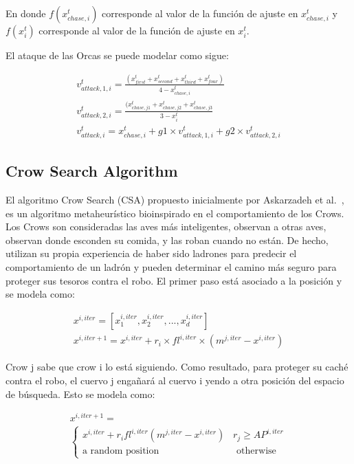 \documentclass[conference]{IEEEtran}
\begin{document}
\noindent En donde $f(x_{chase,i}^t)$ corresponde al valor de la función de ajuste en $x_{chase,i}^t$ y $f(x_{i}^t )$ corresponde al valor de la función de ajuste en $x_{i}^t$.

El ataque de las Orcas se puede modelar como sigue:

\begin{equation}
\begin{gathered}
v_{attack,1,i}^t = \frac{(x_{first}^t+x_{second}^t + x_{third}^t + x_{four}^t)}{4-x_{chase,i}^t} \\
v_{attack,2,i}^t = \frac{(x_{chase,j1}^t+x_{chase,j2}^t + x_{chase,j3}^t}{3-x_{i}^t}  \\
v_{attack,i}^t = x_{chase,i}^t+ g1 \times v_{attack,1,i}^t + g2 \times v_{attack,2,i}^t
\end{gathered}
\label{eq22}
\end{equation}

\subsection{Crow Search Algorithm}

\noindent El algoritmo Crow Search (CSA) propuesto inicialmente por Askarzadeh et al.~\cite{Askarzadeh2016}, es un algoritmo metaheurístico bioinspirado en el comportamiento de los Crows. Los Crows son consideradas las aves más inteligentes, observan a otras aves, observan donde esconden su comida, y las roban cuando no están. De hecho, utilizan su propia experiencia de haber sido ladrones para predecir el comportamiento de un ladrón y pueden determinar el camino más seguro para proteger sus tesoros contra el robo. El primer paso está asociado a la posición y se modela como:

\begin{equation}
\begin{gathered}
x^{i,iter} = [x_{1}^{i,iter}, x_{2}^{i,iter},...,x_{d}^{i,iter}]\\
x^{i,iter+1}=x^{i,iter}+r_{i} \times fl^{i,iter} \times (m^{j,iter}-x^{i,iter})
\end{gathered}
\label{eq23}
\end{equation}

\noindent Crow j sabe que crow i lo está siguiendo. Como resultado, para proteger su caché contra el robo, el cuervo j engañará al cuervo i yendo a otra posición del espacio de búsqueda. Esto se modela como:

\begin{equation}
\begin{gathered}
x^{i,iter+1}=\\
\begin{cases}
x^{i,iter}+r_{i} fl^{i,iter} (m^{j,iter} - x^{i,iter}) \; \; \; r_j \geq AP^{i,iter}\\
\text{a random position} \; \; \; \; \; \;\; \; \;\; \; \;\;\; \; \;\;\; \; \; \; \;\;\; \; \;\; \; \;  \text{otherwise}
\end{cases}
\end{gathered}
\label{eq24}
\end{equation}
\end{document}
